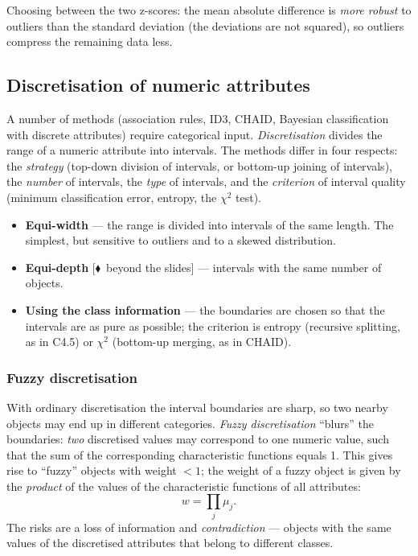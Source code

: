 \documentclass[11pt,a4paper]{article}
\theoremstyle{definition}
\providecommand{\uv}[1]{``#1''}
\newcommand{\mimo}{\textcolor{markcol}{\textsf{\footnotesize[$\blacklozenge$~beyond the slides]}}}
\begin{document}
Choosing between the two z-scores: the mean absolute difference is \emph{more robust} to
outliers than the standard deviation (the deviations are not squared), so outliers compress the
remaining data less.

\subsection{Discretisation of numeric attributes}

A number of methods (association rules, ID3, CHAID, Bayesian classification with discrete
attributes) require categorical input. \emph{Discretisation} divides the range of a numeric
attribute into intervals. The methods differ in four respects: the \emph{strategy} (top-down
division of intervals, or bottom-up joining of intervals), the \emph{number} of intervals, the
\emph{type} of intervals, and the \emph{criterion} of interval quality (minimum classification
error, entropy, the $\chi^2$ test).

\begin{itemize}
\item \textbf{Equi-width} --- the range is divided into intervals of the same length. The
      simplest, but sensitive to outliers and to a skewed distribution.
\item \textbf{Equi-depth} \mimo{} --- intervals with the same number of objects.
\item \textbf{Using the class information} --- the boundaries are chosen so that the intervals
      are as pure as possible; the criterion is entropy (recursive splitting, as in C4.5) or
      $\chi^2$ (bottom-up merging, as in CHAID).
\end{itemize}

\subsubsection{Fuzzy discretisation}

With ordinary discretisation the interval boundaries are sharp, so two nearby objects may end up
in different categories. \emph{Fuzzy discretisation} \uv{blurs} the boundaries: \emph{two}
discretised values may correspond to one numeric value, such that the sum of the corresponding
characteristic functions equals 1. This gives rise to \uv{fuzzy} objects with weight $<1$; the
weight of a fuzzy object is given by the \emph{product} of the values of the characteristic
functions of all attributes:
\[ w = \prod_j \mu_j. \]
The risks are a loss of information and \emph{contradiction} --- objects with the same values of
the discretised attributes that belong to different classes.
\end{document}
